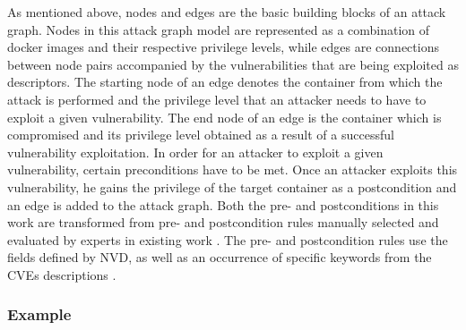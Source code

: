 As mentioned above, nodes and edges are the basic building blocks of an attack graph. Nodes in this attack graph model are represented as a combination of docker images and their respective privilege levels, while edges are connections between node pairs accompanied by the vulnerabilities that are being exploited as descriptors. The starting node of an edge denotes the container from which the attack is performed and the privilege level that an attacker needs to have to exploit a given vulnerability. The end node of an edge is the container which is compromised and its privilege level obtained as a result of a successful vulnerability exploitation. In order for an attacker to exploit a given vulnerability, certain preconditions have to be met. Once an attacker exploits this vulnerability, he gains the privilege of the target container as a postcondition and an edge is added to the attack graph. Both the pre- and postconditions in this work are transformed from pre- and postcondition rules manually selected and evaluated by experts in existing work \cite{aksu2018automated}. The pre- and postcondition rules use the fields defined by NVD, as well as an occurrence of specific keywords from the CVEs descriptions \cite{booth2013national}.

\subsubsection{Example}

